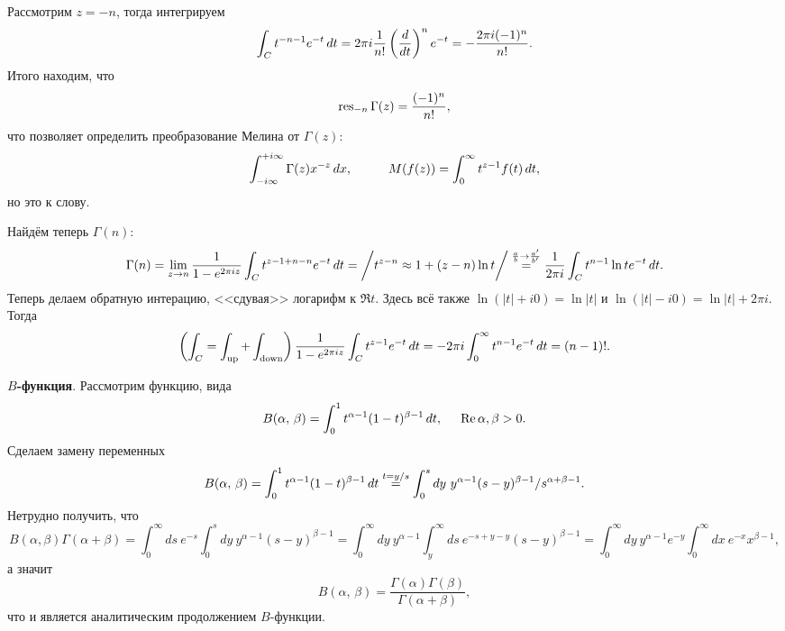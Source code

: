 Рассмотрим $z = -n$, тогда интегрируем
\begin{equation*}
    \int_C t^{-n-1} e^{-t} \, d t = 2 \pi i \frac{1}{n!} \left(\frac{d }{d t} \right)^n e^{-t} = 
    - \frac{2\pi i (-1)^n}{n!}.
\end{equation*}
Итого находим, что
\begin{equation*}
    \mathop{\mathrm{res}}\nolimits_{-n} \Gamma(z) = \frac{(-1)^n}{n!},
\end{equation*}
что позволяет определить преобразование Мелина от $\Gamma(z)$:
\begin{equation*}
    \int_{-i\infty}^{+i\infty}  \Gamma(z) x^{-z} \d x,
    \hspace{10 mm} 
    M(f(z)) = \int_{0}^{\infty} t^{z-1} f(t) \d t,
\end{equation*}
но это к слову. 


Найдём теперь $\Gamma(n)$:
\begin{equation*}
    \Gamma(n) = \lim_{z\to n} \frac{1}{1 - e^{2 \pi i z}} \int_C t^{z-1 + n  -n} e^{-t} \, d t = 
    \bigg/
        t^{z-n} \approx 1 + (z-n) \ln t
    \bigg/ \overset{\frac{a}{b}\to \frac{a'}{b'}}{=}  
    \frac{1}{2\pi i} \int_C t^{n-1} \ln t e^{-t} \, d t.
\end{equation*}
Теперь делаем обратную интерацию, <<сдувая>> логарифм к $\Re t$. Здесь всё также $\ln (|t| + i0) = \ln |t|$ и $\ln (|t| - i 0) = \ln |t| + 2 \pi i$. Тогда
\begin{equation*}
    \left(\int_C = \int_{\text{up}} + \int_{\text{down}}\right) 
    \frac{1}{1-e^{2 \pi i z}} \int_C t^{z-1} e^{-t} \, d t
    = - 2 \pi i \int_0^{\infty} t^{n-1} e^{-t} \, d t = (n-1)!.
\end{equation*}


\textbf{$B$-функция}. Рассмотрим функцию, вида
\begin{equation*}
      B(\alpha,\, \beta) = \int_{0}^{1} t^{\alpha-1} (1-t)^{\beta-1} \, d t,
      \hspace{5 mm} 
      \mathop{\mathrm{Re}}\nolimits \alpha, \beta > 0.
\end{equation*}  
Сделаем замену переменных
\begin{equation*}
    B(\alpha,\, \beta) = \int_{0}^{1}  t^{\alpha-1} (1-t)^{\beta-1} \, d t \overset{t = y/s}{=} 
    \int_{0}^{s} d y\ y^{\alpha-1} (s-y)^{\beta-1} / s^{\alpha + \beta -1}.
\end{equation*}
Нетрудно получить, что
\begin{equation*}
    B(\alpha, \beta) \Gamma(\alpha + \beta) = \int_{0}^{\infty}  d s\ e^{-s} \int_{0}^{s} dy\ y^{\alpha-1} (s-y)^{\beta-1} = 
    \int_{0}^{\infty} dy\ y^{\alpha-1} \int_y^{\infty} ds\ e^{-s + y - y} (s-y)^{\beta-1} = 
    \int_{0}^{\infty}  dy \ y^{\alpha-1} e^{-y} \int_{0}^{\infty} dx\ e^{-x} x^{\beta-1},
\end{equation*}
а значит
\begin{equation}
    B(\alpha,\, \beta) = \frac{\Gamma(\alpha) \Gamma(\beta)}{\Gamma(\alpha + \beta)},
\end{equation}
что и является аналитическим продолжением $B$-функции. 


